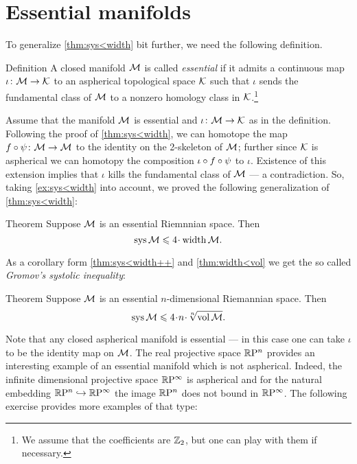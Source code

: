\section{Essential manifolds}

To generalize \ref{thm:sys<width} bit further, we need the following definition.

\begin{thm}{Definition}
A closed manifold $\mathcal{M}$ is called \emph{essential} if it admits a continuous map $\iota\colon\mathcal{M}\to \mathcal{K}$ to an aspherical topological space $\mathcal{K}$ such that $\iota$ sends the fundamental class of $\mathcal{M}$ to a nonzero homology class in $\mathcal{K}$.\footnote{We assume that the coefficients are $\mathbb{Z}_2$, but one can play with them if necessary.}
\end{thm}

Assume that the manifold $\mathcal{M}$ is essential and $\iota \colon\mathcal{M}\to \mathcal{K}$ as in the definition.
Following the proof of \ref{thm:sys<width}, we can homotope the map 
$f\circ\psi\colon\mathcal{M}\to \mathcal{M}$ to the identity on the 2-skeleton of $\mathcal{M}$;
further since $\mathcal{K}$ is aspherical we can homotopy the composition
$\iota\z\circ f\circ\psi$ to  $\iota$. 
Existence of this extension implies that $\iota$ kills the fundamental class of $\mathcal{M}$ --- a contradiction.
So, taking \ref{ex:sys<width} into account, we proved the following generalization of \ref{thm:sys<width}:

\begin{thm}{Theorem}\label{thm:sys<width++}
Suppose $\mathcal{M}$ is an essential Riemnnian space.
Then 
\[\sys\spc{M}\le 4 \cdot \width \spc{M}.\]
\end{thm}

As a corollary form \ref{thm:sys<width++} and \ref{thm:width<vol} we get the so called \emph{Gromov's systolic inequality}:

\begin{thm}{Theorem}\label{thm:sys+}
Suppose $\mathcal{M}$ is an essential $n$-dimensional Riemannian space.
Then 
\[\sys\spc{M}\le 4 \cdot n\cdot \sqrt[n]{\vol\spc{M}}.\]
\end{thm}


Note that any closed aspherical manifold is essential --- in this case one can take $\iota$ to be the identity map on $\mathcal{M}$.
The real projective space $\mathbb{R}\mathrm{P}^n$ provides an interesting example of an essential manifold which is not aspherical.
Indeed, the infinite dimensional projective space $\mathbb{R}\mathrm{P}^\infty$ is aspherical and for the natural embedding $\mathbb{R}\mathrm{P}^n\hookrightarrow\mathbb{R}\mathrm{P}^\infty$ the image $\mathbb{R}\mathrm{P}^n$ does not bound in $\mathbb{R}\mathrm{P}^\infty$.
The following exercise provides more examples of that type:

